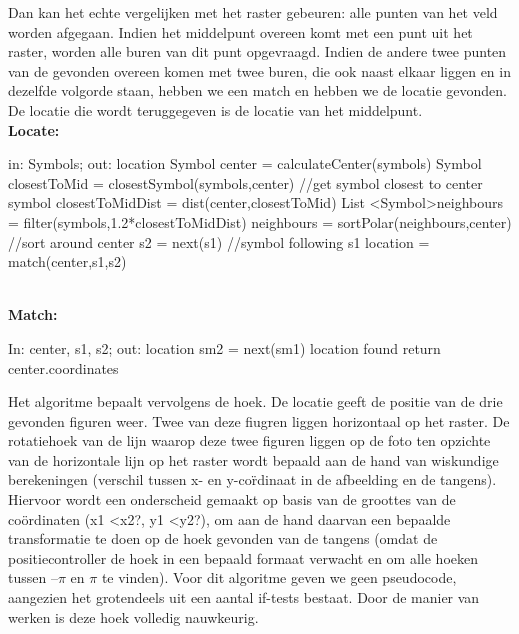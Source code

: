 \documentclass[eind]{penoverslag}
\begin{document}
Dan kan het echte vergelijken met het raster gebeuren: alle punten van het veld worden afgegaan. Indien het middelpunt overeen komt met een punt uit het raster, worden alle buren van dit punt opgevraagd. Indien de andere twee punten van de gevonden overeen komen met twee buren, die ook naast elkaar liggen en in dezelfde volgorde staan, hebben we een match en hebben we de locatie gevonden. De locatie die wordt teruggegeven is de locatie van het middelpunt.\\

\textbf{Locate: }
\begin{algorithmic}

	\STATE in: Symbols; out: location
	\STATE Symbol center = calculateCenter(symbols)
	\STATE Symbol closestToMid = closestSymbol(symbols,center)     //get symbol closest to center symbol
	\STATE closestToMidDist = dist(center,closestToMid)
	\STATE List \textless Symbol\textgreater neighbours = filter(symbols,1.2*closestToMidDist)
	\STATE neighbours = sortPolar(neighbours,center)     //sort around center
		\STATE s2 = next(s1) //symbol following s1
			\STATE location = match(center,s1,s2)
		\ENDIF
	\ENDFOR
	
\end{algorithmic}
~\\
\textbf{Match:}
\begin{algorithmic}
\STATE In: center, s1, s2; out: location
				\STATE sm2 = next(sm1)
					\STATE location found
					\STATE return center.coordinates
				\ENDIF
			\ENDFOR
		\ENDIF
	\ENDFOR
\end{algorithmic}

Het algoritme bepaalt vervolgens de hoek. De locatie geeft de positie van de drie gevonden figuren weer. Twee van deze fiugren liggen horizontaal op het raster. De rotatiehoek van de lijn waarop deze twee figuren liggen op de foto ten opzichte van de horizontale lijn op het raster wordt bepaald aan de hand van wiskundige berekeningen (verschil tussen x- en y-co\"rdinaat in de afbeelding en de tangens).\\

Hiervoor wordt een onderscheid gemaakt op basis van de groottes van de coördinaten (x1 \textless  x2?, y1 \textless  y2?), om aan de hand daarvan een bepaalde transformatie te doen op de hoek gevonden van de tangens (omdat de positiecontroller de hoek in een bepaald formaat verwacht en om alle hoeken tussen $–\pi$ en $\pi$ te vinden). Voor dit algoritme geven we geen pseudocode, aangezien het grotendeels uit een aantal if-tests bestaat. Door de manier van werken is deze hoek volledig nauwkeurig.
\end{document}
